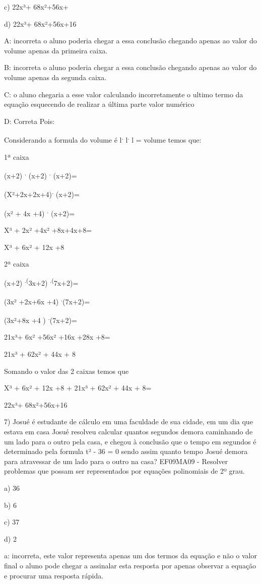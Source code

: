 {c) 22x³+ 68x²+56x+

d) 22x³+ 68x²+56x+16

A: incorreta o aluno poderia chegar a essa conclusão chegando apenas ao
valor do volume apenas da primeira caixa.

B: incorreta o aluno poderia chegar a essa conclusão chegando apenas ao
valor do volume apenas da segunda caixa.

C: o aluno chegaria a esse valor calculando incorretamente o ultimo
termo da equação esquecendo de realizar a última parte valor numérico

D: Correta Pois:

Considerando a formula do volume é l\textsuperscript{.}
l\textsuperscript{.} l = volume temos que:

1ª caixa

(x+2) \textsuperscript{.} (x+2) \textsuperscript{.} (x+2)=

(X²+2x+2x+4)\textsuperscript{.} (x+2)=

(x² + 4x +4) \textsuperscript{.} (x+2)=

X³ + 2x² +4x² +8x+4x+8=

X³ + 6x² + 12x +8

2ª caixa

(x+2) \textsuperscript{.(}3x+2) \textsuperscript{.(}7x+2)=

(3x² +2x+6x +4) \textsuperscript{.}(7x+2)=

(3x²+8x +4 ) \textsuperscript{.}(7x+2)=

21x³+ 6x² +56x² +16x +28x +8=

21x³ + 62x² + 44x + 8

Somando o valor das 2 caixas temos que

X³ + 6x² + 12x +8 + 21x³ + 62x² + 44x + 8=

22x³+ 68x²+56x+16

7) Josué é estudante de cálculo em uma faculdade de sua cidade, em um
dia que estava em casa Josué resolveu calcular quantos segundos demora
caminhando de um lado para o outro pela casa, e chegou à conclusão que o
tempo em segundos é determinado pela formula t² - 36 = 0 sendo assim
quanto tempo Josué demora para atravessar de um lado para o outro na
casa? EF09MA09 - Resolver problemas que possam ser representados por
equações polinomiais de 2º grau.

a) 36

b) 6

c) 37

d) 2

a: incorreta, este valor representa apenas um dos termos da equação e
não o valor final o aluno pode chegar a assinalar esta resposta por
apenas observar a equação e procurar uma resposta rápida.

}
